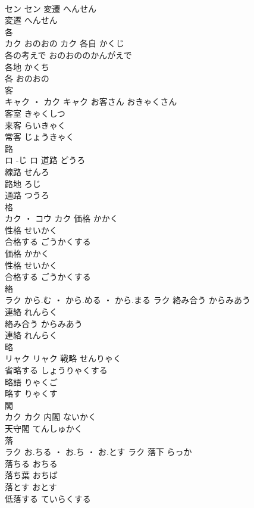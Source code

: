 \documentclass[8pt]{extreport}
\begin{document}
\begin{CJK}{UTF8}{min}
\\	セン		セン	変遷	へんせん	
\\	変遷	へんせん	
\\	各	
\\	カク	おのおの	カク	各自	かくじ	
\\	各の考えで	おのおののかんがえで	
\\	各地	かくち	
\\	各	おのおの	
\\	客	
\\	キャク ・ カク		キャク	お客さん	おきゃくさん	
\\	客室	きゃくしつ	
\\	来客	らいきゃく	
\\	常客	じょうきゃく	
\\	路	
\\	ロ	-じ	ロ	道路	どうろ	
\\	線路	せんろ	
\\	路地	ろじ	
\\	通路	つうろ	
\\	格	
\\	カク ・ コウ		カク	価格	かかく	
\\	性格	せいかく	
\\	合格する	ごうかくする	
\\	価格	かかく	
\\	性格	せいかく	
\\	合格する	ごうかくする	
\\	絡	
\\	ラク	から.む ・ から.める ・ から.まる	ラク	絡み合う	からみあう	
\\	連絡	れんらく	
\\	絡み合う	からみあう	
\\	連絡	れんらく	
\\	略	
\\	リャク		リャク	戦略	せんりゃく	
\\	省略する	しょうりゃくする	
\\	略語	りゃくご	
\\	略す	りゃくす	
\\	閣	
\\	カク		カク	内閣	ないかく	
\\	天守閣	てんしゅかく	
\\	落	
\\	ラク	お.ちる ・ お.ち ・ お.とす	ラク	落下	らっか	
\\	落ちる	おちる	
\\	落ち葉	おちば	
\\	落とす	おとす	
\\	低落する	ていらくする	

\end{CJK}
\end{document}
